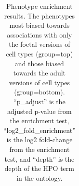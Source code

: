 \documentclass[
]{article}
\begin{document}
\begin{longtable}[]{@{}
  >{\raggedright\arraybackslash}p{}
  >{\raggedright\arraybackslash}p{}
  >{\raggedright\arraybackslash}p{}
  >{\raggedleft\arraybackslash}p{}
  >{\raggedleft\arraybackslash}p{}
  >{\raggedleft\arraybackslash}p{}@{}}

\caption{\label{tbl-hpo_enrich}Phenotype enrichment results. The
phenotypes most biased towards associations with only the foetal
versions of cell types (group=top) and those biased towards the adult
versions of cell types (group=bottom). ``p\_adjust'' is the adjusted
p-value from the enrichment test, ``log2\_fold\_enrichment'' is the log2
fold-change from the enrichment test, and ``depth'' is the depth of the
HPO term in the ontology.}

\tabularnewline


\end{longtable}
\end{document}
